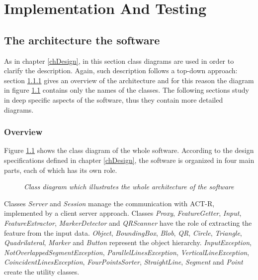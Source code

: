 \chapter{Implementation And Testing}

	\section{The architecture the software}
	As in chapter \ref{chDesign}, in this section class diagrams are used in order to clarify the description. Again, such description follows a top-down approach: section \ref{impl_arch} gives an overview of the architecture and for this reason the diagram in figure \ref{fig:implementationOnlyNames} contains only the names of the classes. The following sections study in deep specific aspects of the software, thus they contain more detailed diagrams.

	\subsection{Overview}\label{impl_arch}
	Figure \ref{fig:implementationOnlyNames} shows the class diagram of the whole software. 
	According to the design specifications defined in chapter \ref{chDesign}, the software is organized in four main parts, each of which has its own role.

	\begin{figure}[h]
	  \begin{center} 
	  \end{center} 
	  \caption{\textit{Class diagram which illustrates the whole architecture of the software}}  
	  \label{fig:implementationOnlyNames}
 	\end{figure}
 
	Classes \emph{Server} and \emph{Session} manage the communication with \mbox{ACT-R}, implemented by a client server approach.
	Classes \emph{Proxy}, \emph{FeatureGetter}, \emph{Input}, \emph{FeatureExtractor}, \emph{MarkerDetector} and \emph{QRScanner} have the role of extracting the feature from the input data.
	\emph{Object}, \emph{BoundingBox}, \emph{Blob}, \emph{QR}, \emph{Circle}, \emph{Triangle}, \emph{Quadrilateral}, \emph{Marker} and \emph{Button} represent the object hierarchy.
	\emph{InputException}, \emph{NotOverlappedSegmentException}, \emph{ParallelLinesException}, \emph{VerticalLineException}, \emph{CoincidentLinesException}, \emph{FourPointsSorter}, \emph{StraightLine}, \emph{Segment} and \emph{Point} create the utility classes.
	
